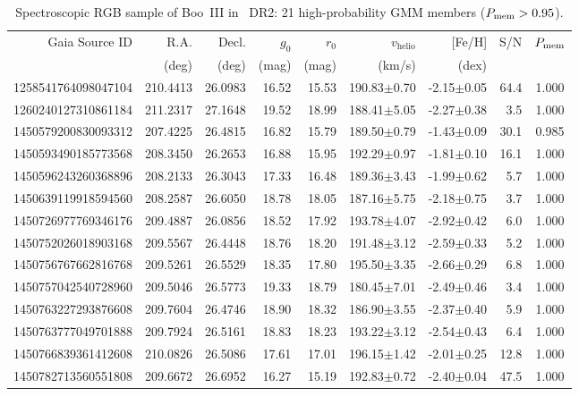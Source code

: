 \begin{table}[ht]
\centering
\caption{Spectroscopic RGB sample of Boo~III in \SSSSS\ DR2: 21 high-probability GMM members ($P_{\rm mem} > 0.95$). \label{tab:boo3_S5_sample}}
\footnotesize
\setlength{\tabcolsep}{4pt}
\begin{tabular}{rrrrrrrrc}
\hline\hline
Gaia Source ID & R.A. & Decl. & $g_0$ & $r_0$ & $v_\mathrm{helio}$ & [Fe/H] & S/N & $P_{\rm mem}$ \\
 & (deg) & (deg) & (mag) & (mag) & (km/s) & (dex) &  &  \\
\hline
1258541764098047104 & 210.4413 & 26.0983 & 16.52 & 15.53 & 190.83$\pm$0.70 & -2.15$\pm$0.05 & 64.4 & 1.000 \\
1260240127310861184 & 211.2317 & 27.1648 & 19.52 & 18.99 & 188.41$\pm$5.05 & -2.27$\pm$0.38 & 3.5 & 1.000 \\
1450579200830093312 & 207.4225 & 26.4815 & 16.82 & 15.79 & 189.50$\pm$0.79 & -1.43$\pm$0.09 & 30.1 & 0.985 \\
1450593490185773568 & 208.3450 & 26.2653 & 16.88 & 15.95 & 192.29$\pm$0.97 & -1.81$\pm$0.10 & 16.1 & 1.000 \\
1450596243260368896 & 208.2133 & 26.3043 & 17.33 & 16.48 & 189.36$\pm$3.43 & -1.99$\pm$0.62 & 5.7 & 1.000 \\
1450639119918594560 & 208.2587 & 26.6050 & 18.78 & 18.05 & 187.16$\pm$5.75 & -2.18$\pm$0.75 & 3.7 & 1.000 \\
1450726977769346176 & 209.4887 & 26.0856 & 18.52 & 17.92 & 193.78$\pm$4.07 & -2.92$\pm$0.42 & 6.0 & 1.000 \\
1450752026018903168 & 209.5567 & 26.4448 & 18.76 & 18.20 & 191.48$\pm$3.12 & -2.59$\pm$0.33 & 5.2 & 1.000 \\
1450756767662816768 & 209.5261 & 26.5529 & 18.35 & 17.80 & 195.50$\pm$3.35 & -2.66$\pm$0.29 & 6.8 & 1.000 \\
1450757042540728960 & 209.5046 & 26.5773 & 19.33 & 18.79 & 180.45$\pm$7.01 & -2.49$\pm$0.46 & 3.4 & 1.000 \\
1450763227293876608 & 209.7604 & 26.4746 & 18.90 & 18.32 & 186.90$\pm$3.55 & -2.37$\pm$0.40 & 5.9 & 1.000 \\
1450763777049701888 & 209.7924 & 26.5161 & 18.83 & 18.23 & 193.22$\pm$3.12 & -2.54$\pm$0.43 & 6.4 & 1.000 \\
1450766839361412608 & 210.0826 & 26.5086 & 17.61 & 17.01 & 196.15$\pm$1.42 & -2.01$\pm$0.25 & 12.8 & 1.000 \\
1450782713560551808 & 209.6672 & 26.6952 & 16.27 & 15.19 & 192.83$\pm$0.72 & -2.40$\pm$0.04 & 47.5 & 1.000 \\

\end{tabular}
\end{table}
